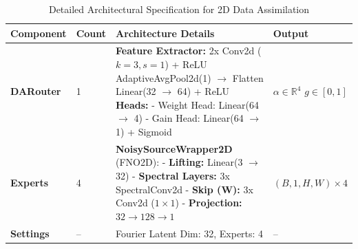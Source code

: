\documentclass[preprint,12pt,authoryear]{elsarticle}
\begin{document}
\begin{table}[ht]
\centering
\caption{Detailed Architectural Specification for 2D Data Assimilation}
\label{tab:softmax_fno_2d}
\small
\begin{tabularx}{\textwidth}{@{} ll X l @{}}
\toprule
\textbf{Component} & \textbf{Count} & \textbf{Architecture Details} & \textbf{Output} \\ \midrule

\textbf{DARouter} & 1 & \textbf{Feature Extractor:} \newline 
2x Conv2d ($k=3, s=1$) + ReLU \newline 
AdaptiveAvgPool2d(1) $\to$ Flatten \newline 
Linear(32 $\to$ 64) + ReLU \newline 
\textbf{Heads:} \newline
- Weight Head: Linear(64 $\to$ 4) \newline
- Gain Head: Linear(64 $\to$ 1) + Sigmoid & $\alpha \in \mathbb{R}^{4}$ \newline $g \in [0, 1]$ \\ \addlinespace

\textbf{Experts} & 4 & \textbf{NoisySourceWrapper2D} (FNO2D): \newline
- \textbf{Lifting:} Linear(3 $\to$ 32) \newline
- \textbf{Spectral Layers:} 3x SpectralConv2d \newline
- \textbf{Skip (W):} 3x Conv2d ($1 \times 1$) \newline
- \textbf{Projection:} $32 \to 128 \to 1$ & $(B, 1, H, W) \times 4$ \\ \addlinespace

\textbf{Settings} & -- & Fourier Latent Dim: 32, Experts: 4 & -- \\ 
\bottomrule
\end{tabularx}
\end{table}
\end{document}
